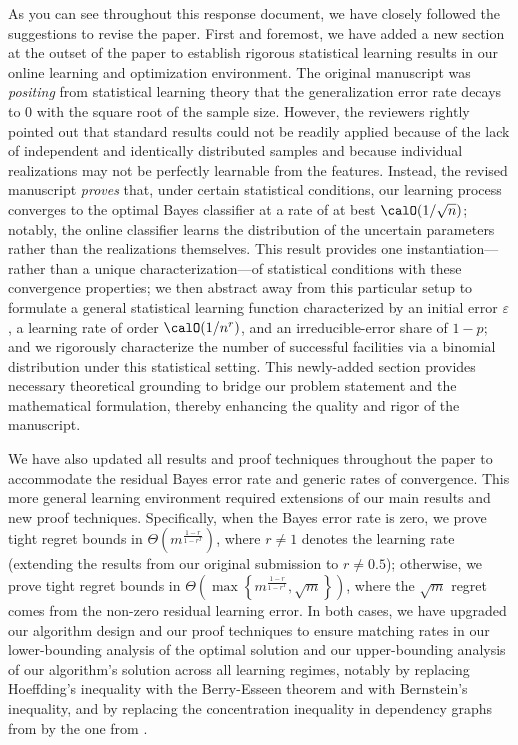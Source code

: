 \documentclass[11pt]{article}
\begin{document}
As you can see throughout this response document, we have closely followed the suggestions to revise the paper. First and foremost, we have added a new section at the outset of the paper to establish rigorous statistical learning results in our online learning and optimization environment. The original manuscript was \textit{positing} from statistical learning theory that the generalization error rate decays to 0 with the square root of the sample size. However, the reviewers rightly pointed out that standard results could not be readily applied because of the lack of independent and identically distributed samples and because individual realizations may not be perfectly learnable from the features. Instead, the revised manuscript \textit{proves} that, under certain statistical conditions, our learning process converges to the optimal Bayes classifier at a rate of at best $\calO(1/\sqrt{n})$; notably, the online classifier learns the distribution of the uncertain parameters rather than the realizations themselves. This result provides one instantiation—rather than a unique characterization—of statistical conditions with these convergence properties; we then abstract away from this particular setup to formulate a general statistical learning function characterized by an initial error $\varepsilon$, a learning rate of order $\calO(1/n^{r})$, and an irreducible-error share of $1-p$; and we rigorously characterize the number of successful facilities via a binomial distribution under this statistical setting. This newly-added section provides necessary theoretical grounding to bridge our problem statement and the mathematical formulation, thereby enhancing the quality and rigor of the manuscript.

We have also updated all results and proof techniques throughout the paper to accommodate the residual Bayes error rate and generic rates of convergence. This more general learning environment required extensions of our main results and new proof techniques. Specifically, when the Bayes error rate is zero, we prove tight regret bounds in $\Theta\left(m^{\frac{1-r}{1-r^T}}\right)$, where $r\neq1$ denotes the learning rate (extending the results from our original submission to $r\neq0.5$); otherwise, we prove tight regret bounds in $\Theta\left(\max\left\{m^{\frac{1-r}{1-r^T}},\sqrt{m}\right\}\right)$, where the $\sqrt{m}$ regret comes from the non-zero residual learning error. In both cases, we have upgraded our algorithm design and our proof techniques to ensure matching rates in our lower-bounding analysis of the optimal solution and our upper-bounding analysis of our algorithm's solution across all learning regimes, notably by replacing Hoeffding's inequality with the Berry-Esseen theorem and with Bernstein's inequality, and by replacing the concentration inequality in dependency graphs from \cite{janson2004large} by the one from \cite{janisch2024berry}.
\end{document}
